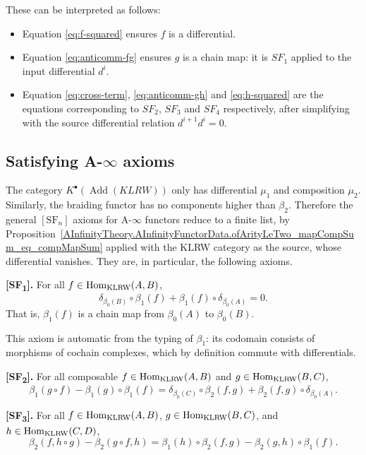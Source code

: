 These can be interpreted as follows:

\begin{itemize}
    \item Equation \ref{eq:f-squared} ensures $f$ is a differential.
    \item Equation \ref{eq:anticomm-fg} ensures $g$ is a chain map: it is $SF_1$ applied to the input differential $d^i$.
    \item Equation \ref{eq:cross-term}, \ref{eq:anticomm-gh} and \ref{eq:h-squared} are the equations corresponding to $SF_2$, $SF_3$ and $SF_4$ respectively, after simplifying with the source differential relation $d^{i+1}d^i=0$.
\end{itemize}

\subsection{Satisfying A-\texorpdfstring{$\infty$}{infinity} axioms}

The category $K^\bullet(\operatorname{Add}(KLRW))$ only has differential $\mu_1$ and composition $\mu_2$. Similarly, the braiding functor has no components higher than $\beta_2$. Therefore the general $[\text{SF}_n]$ axioms for A-$\infty$ functors reduce to a finite list, by Proposition~\ref{AInfinityTheory.AInfinityFunctorData.ofArityLeTwo_mapCompSum_eq_compMapSum} applied with the KLRW category as the source, whose differential vanishes. They are, in particular, the following axioms.

\textbf{[SF\textsubscript{1}].}
For all $f \in \operatorname{Hom}_{\operatorname{KLRW}}(A, B)$,
$$
  \delta_{\beta_0(B)} \circ \beta_1(f) + \beta_1(f) \circ \delta_{\beta_0(A)} = 0.
$$
That is, $\beta_1(f)$ is a chain map from $\beta_0(A)$ to $\beta_0(B)$.

\begin{remark}
  This axiom is automatic from the typing of $\beta_1$: its codomain
  consists of morphisms of cochain complexes, which by definition
  commute with differentials.
\end{remark}

\textbf{[SF\textsubscript{2}].}
For all composable $f \in \operatorname{Hom}_{\operatorname{KLRW}}(A, B)$ and $g \in \operatorname{Hom}_{\operatorname{KLRW}}(B, C)$,
$$
  \beta_1(g \circ f) - \beta_1(g) \circ \beta_1(f)
  = \delta_{\beta_0(C)} \circ \beta_2(f, g) + \beta_2(f, g) \circ \delta_{\beta_0(A)}.
$$

\textbf{[SF\textsubscript{3}].}
For all $f \in \operatorname{Hom}_{\operatorname{KLRW}}(A, B)$,
$g \in \operatorname{Hom}_{\operatorname{KLRW}}(B, C)$, and $h \in \operatorname{Hom}_{\operatorname{KLRW}}(C, D)$,
$$
  \beta_2(f, h \circ g) - \beta_2(g \circ f, h)
  = \beta_1(h) \circ \beta_2(f, g) -  \beta_2(g, h)\circ \beta_1(f).
$$

